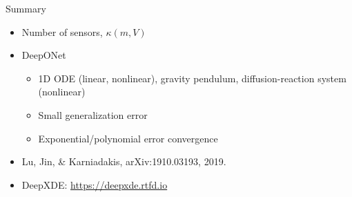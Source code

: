 \documentclass{beamer}
\begin{document}
\begin{frame}{Summary}
\begin{itemize}
\item Number of sensors, $\kappa (m,V)$
\item DeepONet
\begin{itemize}
\item 1D ODE (linear, nonlinear), gravity pendulum, diffusion-reaction system (nonlinear)
\item Small generalization error
\item Exponential/polynomial error convergence
\end{itemize}
\end{itemize}
\vspace{1em}
\begin{itemize}
\item Lu, Jin, \& Karniadakis, arXiv:1910.03193, 2019.
\item DeepXDE: \url{https://deepxde.rtfd.io}
\end{itemize}
\end{frame}
\end{document}
